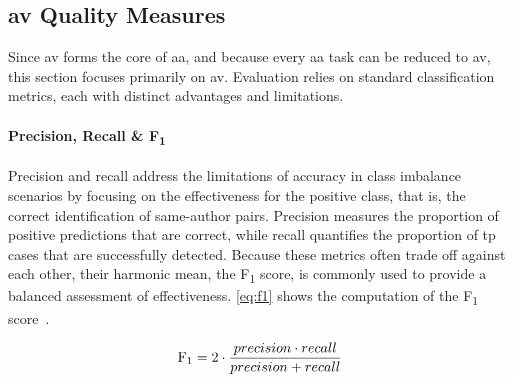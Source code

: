 \subsection{\acs{av} Quality Measures}
\label{subsec:av_quality_measures}

Since \ac{av} forms the core of \ac{aa}, and because every \ac{aa} task can be reduced to \ac{av}, this section focuses primarily on \ac{av}. 
Evaluation relies on standard classification metrics, each with distinct advantages and limitations.



\paragraph{Precision, Recall \& F\textsubscript{1}}
Precision and recall address the limitations of accuracy in class imbalance scenarios by focusing on the effectiveness for the positive class, that is, the correct identification of same-author pairs. 
Precision measures the proportion of positive predictions that are correct, while recall quantifies the proportion of \ac{tp} cases that are successfully detected. 
Because these metrics often trade off against each other, their harmonic mean, the F\textsubscript{1} score, is commonly used to provide a balanced assessment of effectiveness. 
\autoref{eq:f1} shows the computation of the F\textsubscript{1} score~\citep{neal_surveying_2018}.

\begin{equation}\label{eq:f1}
     \text{F\textsubscript{1}} = 2 \cdot \frac{precision \cdot recall}{precision + recall}
\end{equation}

